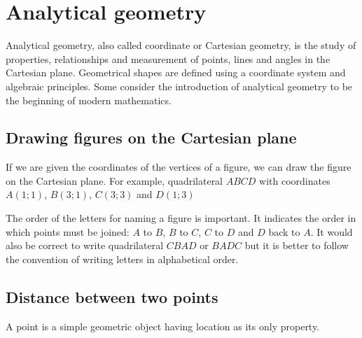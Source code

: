 \chapter{Analytical geometry}
Analytical geometry, also called coordinate or Cartesian geometry, is the study of properties, relationships and measurement of points, lines and angles in the Cartesian plane. Geometrical shapes are defined using a coordinate system and algebraic principles. Some consider the introduction of analytical geometry to be the beginning of modern mathematics.\par 

\section{Drawing figures on the Cartesian plane}
If we are given the coordinates of the vertices of a figure, we can draw the figure on the Cartesian plane. For example, quadrilateral $ABCD$ with coordinates $A(1;1)$, $B(3;1)$, $C(3;3)$ and $D(1;3)$  

\setcounter{subfigure}{0}
\begin{figure}[H] %
\begin{center}
\end{center}
\label{fig:cartesianplane}
\end{figure} 

The order of the letters for naming a figure is important. It indicates the order in which points must be joined: $A$ to $B$, $B$ to $C$, $C$ to $D$ and $D$ back to $A$. It would also be correct to write quadrilateral $CBAD$ or $BADC$ but it is better to follow the convention of writing letters in alphabetical order.     

\section{ Distance between two points}
A point is a simple geometric object having location as its only property. 


